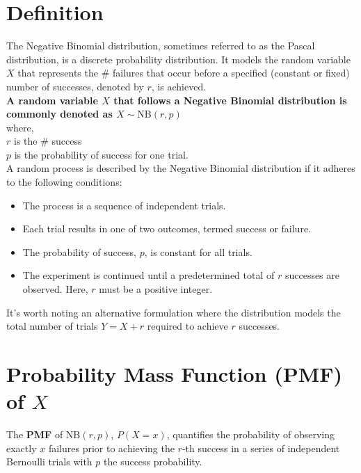 \section{Definition}
\begin{definition}
  \label{def:neg-binomial}
  The Negative Binomial distribution, sometimes referred to as the Pascal
  distribution, is a discrete probability distribution. It models the random
  variable \(X\) that represents the \(\#\) failures that occur
  before a specified (constant or fixed) number of successes, denoted by \(r\),
  is achieved.\\

  \textbf{A random variable \(X\) that follows a Negative Binomial distribution is
  commonly denoted as \(X \sim \text{NB}(r, p)\)}\\
  where,\\
  \(r\) is the \(\#\) success\\
  \(p\) is the probability of success for one trial.\\

  A random process is described by the Negative Binomial distribution if it
  adheres to the following conditions:
  \begin{itemize}
    \item The process is a sequence of independent trials.
    \item Each trial results in one of two outcomes, termed success or failure.
    \item The probability of success, \(p\), is constant for all trials.
    \item The experiment is continued until a predetermined total of \(r\)
      successes are observed. Here, \(r\) must be a positive integer.
  \end{itemize}
\end{definition}

\begin{remark}
  \label{remark:alter-formulation-nbd}
  It's worth noting an alternative formulation where the distribution
  models the total number of trials \(Y = X+r\) required to achieve \(r\)
  successes.
\end{remark}

\section{Probability Mass Function (PMF) of \(X\)}
The \textbf{PMF} of \(\text{NB}(r,p)\), \(P(X=x)\), quantifies the probability
of observing exactly \(x\) failures prior to achieving the \(r\)-th success in a
series of independent Bernoulli trials with \(p\) the success probability.

